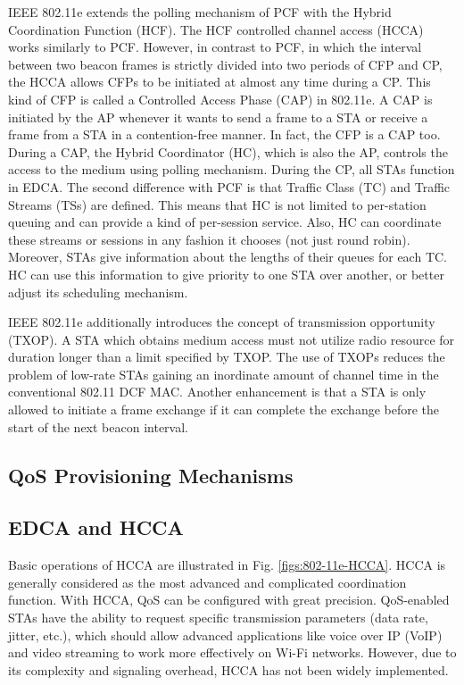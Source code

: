 IEEE 802.11e extends the polling mechanism of PCF with the Hybrid Coordination Function (HCF). The HCF controlled channel access (HCCA) works similarly to PCF. However, in contrast to PCF, in which the interval between two beacon frames is strictly divided into two periods of CFP and CP, the HCCA allows CFPs to be initiated at almost any time during a CP. This kind of CFP is called a Controlled Access Phase (CAP) in 802.11e. A CAP is initiated by the AP whenever it wants to send a frame to a STA or receive a frame from a STA in a contention-free manner. In fact, the CFP is a CAP too. During a CAP, the Hybrid Coordinator (HC), which is also the AP, controls the access to the medium using polling mechanism. During the CP, all STAs function in EDCA. The second difference with PCF is that Traffic Class (TC) and Traffic Streams (TSs) are defined. This means that HC is not limited to per-station queuing and can provide a kind of per-session service. Also, HC can coordinate these streams or sessions in any fashion it chooses (not just round robin). Moreover, STAs give information about the lengths of their queues for each TC. HC can use this information to give priority to one STA over another, or better adjust its scheduling mechanism.

IEEE 802.11e additionally introduces the concept of transmission opportunity (TXOP). A STA which obtains medium access must not utilize radio resource for duration longer than a limit specified by TXOP. The use of TXOPs reduces the problem of low-rate STAs gaining an inordinate amount of channel time in the conventional 802.11 DCF MAC. Another enhancement is that a STA is only allowed to initiate a frame exchange if it can complete the exchange before the start of the next beacon interval.
\subsection{QoS Provisioning Mechanisms}
\label{qos}

\subsection{EDCA and HCCA}
\label{edca-hcca}
Basic operations of HCCA are illustrated in Fig. \ref{figs:802-11e-HCCA}. HCCA is generally considered as the most advanced and complicated coordination function. With HCCA, QoS can be configured with great precision. QoS-enabled STAs have the ability to request specific transmission parameters (data rate, jitter, etc.), which should allow advanced applications like voice over IP (VoIP) and video streaming to work more effectively on Wi-Fi networks. However, due to its complexity and signaling overhead, HCCA has not been widely implemented.

